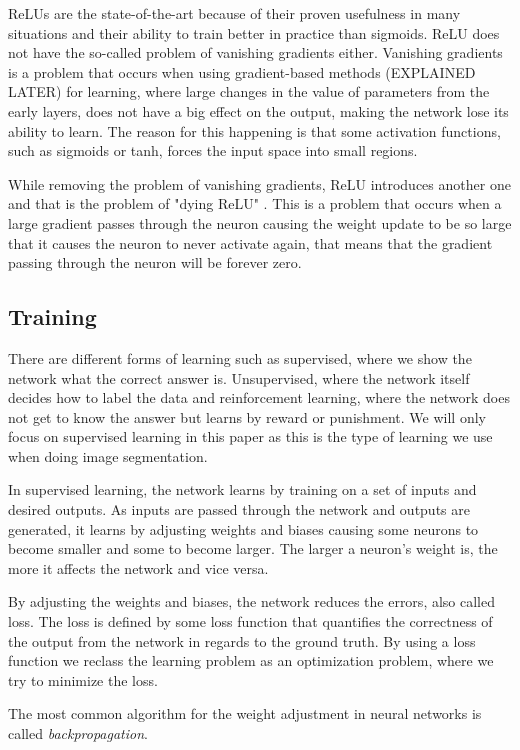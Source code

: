 ReLUs are the state-of-the-art because of their proven usefulness in many situations and their ability to train better in practice than sigmoids. ReLU does not have the so-called problem of vanishing gradients either. Vanishing gradients is a problem that occurs when using gradient-based methods (EXPLAINED LATER) for learning, where large changes in the value of parameters from the early layers, does not have a big effect on the output, making the network lose its ability to learn. The reason for this happening is that some activation functions, such as sigmoids or tanh, forces the input space into small regions. 

While removing the problem of vanishing gradients, ReLU introduces another one and that is the problem of "dying ReLU" \cite{Li}. This is a problem that occurs when a large gradient passes through the neuron causing the weight update to be so large that it causes the neuron to never activate again, that means that the gradient passing through the neuron will be forever zero.


\subsection{Training}
There are different forms of learning such as supervised, where we show the network what the correct answer is. Unsupervised, where the network itself decides how to label the data and reinforcement learning, where the network does not get to know the answer but learns by reward or punishment. We will only focus on supervised learning in this paper as this is the type of learning we use when doing image segmentation.

In supervised learning, the network learns by training on a set of inputs and desired outputs. As inputs are passed through the network and outputs are generated, it learns by adjusting weights and biases causing some neurons to become smaller and some to become larger. The larger a neuron's weight is, the more it affects the network and vice versa.

By adjusting the weights and biases, the network reduces the errors, also called loss. The loss is defined by some loss function that quantifies the correctness of the output from the network in regards to the ground truth. By using a loss function we reclass the learning problem as an optimization problem, where we try to minimize the loss.

The most common algorithm for the weight adjustment in neural networks is called \emph{backpropagation}.


